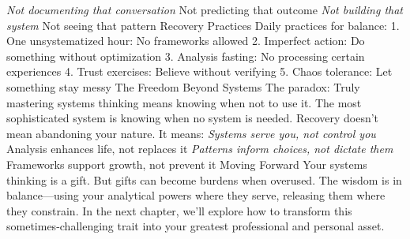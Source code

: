 \documentclass[12pt]{book}
\begin{document}
\textit{ Not documenting that conversation
} Not predicting that outcome
\textit{ Not building that system
} Not seeing that pattern
Recovery Practices
Daily practices for balance:
1. One unsystematized hour: No frameworks allowed
2. Imperfect action: Do something without optimization
3. Analysis fasting: No processing certain experiences
4. Trust exercises: Believe without verifying
5. Chaos tolerance: Let something stay messy
The Freedom Beyond Systems
The paradox: Truly mastering systems thinking means knowing when not to use it. The most sophisticated system is knowing when no system is needed.
Recovery doesn't mean abandoning your nature. It means:
\textit{ Systems serve you, not control you
} Analysis enhances life, not replaces it
\textit{ Patterns inform choices, not dictate them
} Frameworks support growth, not prevent it
Moving Forward
Your systems thinking is a gift. But gifts can become burdens when overused. The wisdom is in balance—using your analytical powers where they serve, releasing them where they constrain.
In the next chapter, we'll explore how to transform this sometimes-challenging trait into your greatest professional and personal asset.
\end{document}
